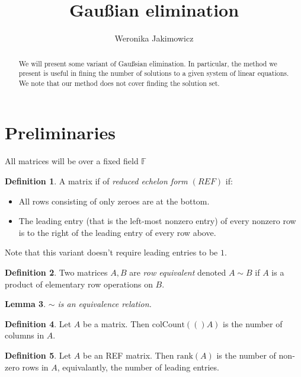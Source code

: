 \documentclass{article}
\title{Gaußian elimination}
\author{Weronika Jakimowicz}
\newcommand{\rank}[1]{\text{rank}(#1)}
\newcommand{\colctn}[1]{\text{colCount}(#1)}
\newtheorem{lemma}{Lemma}[subsection]
\theoremstyle{definition}
\newtheorem{deff}[lemma]{Definition}
\begin{document}
\maketitle

\begin{abstract}
We will present some variant of Gaußsian elimination. In particular, the method we present is useful in fining the number of solutions to a given system of linear equations. We note that our method does not cover finding the solution set.
\end{abstract}

\setcounter{section}{-1}

\section{Preliminaries}
All matrices will be over a fixed field $\mathbb{F}$

\begin{deff}
A matrix if of \emph{reduced echelon form $(REF)$} if:
\begin{itemize}
\item All rows consisting of only zeroes are at the bottom.
\item The leading entry (that is the left-most nonzero entry) of every nonzero row is to the right of the leading entry of every row above.
\end{itemize}
\end{deff}

Note that this variant doesn't require leading entries to be $1$.

\begin{deff}
Two matrices $A,B$ are \emph{row equivalent} denoted $A\sim B$ if $A$ is a product of elementary row operations on $B$.
\end{deff}

\begin{lemma}
$\sim$ is an equivalence relation.
\end{lemma}

\begin{deff}
Let $A$ be a matrix. Then $\colctn(A)$ is the number of columns in $A$.
\end{deff}

\begin{deff}
Let $A$ be an REF matrix. Then $\rank{A}$ is the number of non-zero rows in $A$, equivalantly, the number of leading entries.
\end{deff}
\end{document}
